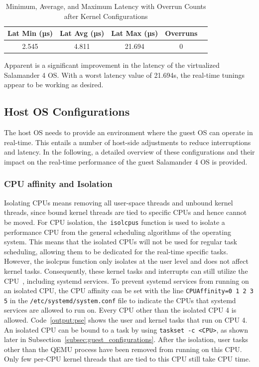 \documentclass[MMR,Master,english]{twbook}
\begin{document}
\begin{table}[H]
	\centering
	\caption[Latency Statistics with Overrun Counts after Kernel Configurations]{Minimum, Average, and Maximum Latency with Overrun Counts after Kernel Configurations}
	\label{tab:latency_overrun_msw_new_virt_kernel}
	\begin{tabular}{|c|c|c|c|c|}
		\hline
		\textbf{Lat Min (µs)} & \textbf{Lat Avg (µs)} & \textbf{Lat Max (µs)} & \textbf{Overruns} \\ \hline
		2.545                 & 4.811                 & 21.694                & 0                 \\ \hline
	\end{tabular}
\end{table}

\noindent Apparent is a significant improvement in the latency of the virtualized Salamander 4 OS. With a worst latency value of 21.694\textmu s, the real-time tunings appear to be working as desired.

\clearpage

\subsection{Host OS Configurations}\label{subsec:host_configurations}
The host OS needs to provide an environment where the guest OS can operate in real-time. This entails a number of host-side adjustments to reduce interruptions and latency. In the following, a detailed overview of these configurations and their impact on the real-time performance of the guest Salamander 4 OS is provided.
\subsubsection{CPU affinity and Isolation}\label{subsubsec:cpu_isolation}

Isolating CPUs means removing all user-space threads and unbound kernel threads, since bound kernel threads are tied to specific CPUs and hence cannot be moved. For CPU isolation, the~\texttt{isolcpus} function is used to isolate a performance CPU from the general scheduling algorithms of the operating system. This means that the isolated CPUs will not be used for regular task scheduling, allowing them to be dedicated for the real-time specific tasks. However, the isolcpus function only isolates at the user level and does not affect kernel tasks. Consequently, these kernel tasks and interrupts can still utilize the CPU~\cite{maPerformanceTuningKVMbased2013}, including systemd services. To prevent systemd services from running on an isolated CPU, the CPU affinity can be set with the line \texttt{CPUAffinity=0 1 2 3 5} in the \texttt{/etc/systemd/system.conf} file to indicate the CPUs that systemd services are allowed to run on. Every CPU other than the isolated CPU 4 is allowed. Code~\ref{output:pse} shows the user and kernel tasks that run on CPU 4. An isolated CPU can be bound to a task by using \texttt{taskset -c <CPU>}, as shown later in Subsection~\ref{subsec:guest_configurations}. After the isolation, user tasks other than the QEMU process have been removed from running on this CPU. Only few per-CPU kernel threads that are tied to this CPU still take CPU time.
\end{document}
